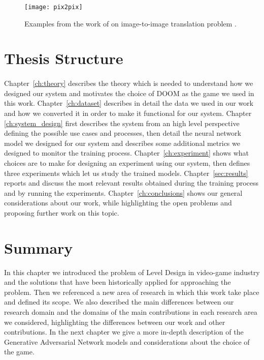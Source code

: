 \begin{figure}[h!]
	\begin{center}
		\texttt{[image: pix2pix]}
	\end{center}
	
	\captionsetup{width=1\linewidth}
	\caption[Pix2Pix example from \citeauthor{image-to-image}]{Examples from the work of \citeauthor{image-to-image} on image-to-image translation problem \cite{image-to-image}.}
	\label{fig:img-to-img}
	\medskip
	
\end{figure}



\section{Thesis Structure}
\paragraph{} Chapter~\ref{ch:theory} describes the theory which is needed to understand how we designed our system and motivates the choice of DOOM as the game we used in this work. Chapter~\ref{ch:dataset} describes in detail the data we used in our work and how we converted it in order to make it functional for our system. Chapter \ref{ch:system_design} first describes the system from an high level perspective defining the possible use cases and processes, then detail the neural network model we designed for our system and describes some additional metrics we designed to monitor the training process. Chapter~\ref{ch:experiment} shows what choices are to make for designing an experiment using our system, then defines three experiments which let us study the trained models. Chapter~\ref{sec:results} reports and discuss the most relevant results obtained during the training process and by running the experiments. Chapter~\ref{ch:conclusions} shows our general considerations about our work, while highlighting the open problems and proposing further work on this topic.

\section{Summary}
In this chapter we introduced the problem of Level Design in video-game industry and the solutions that have been historically applied for approaching the problem. Then we referenced a new area of research in which this work take place and defined its scope.
We also described the main differences between our research domain and the domains of the main contributions in each research area we considered, highlighting the differences between our work and other contributions. In the next chapter we give a more in-depth description of the Generative Adversarial Network models and considerations about the choice of the game. 
